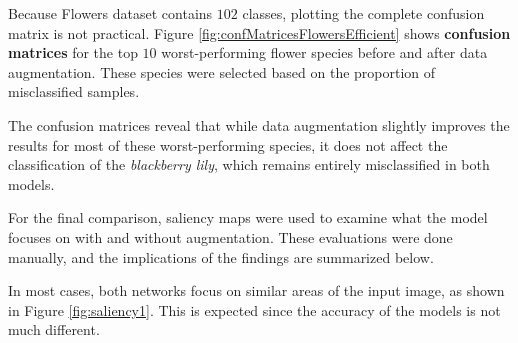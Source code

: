 Because Flowers dataset contains $102$ classes, plotting the complete confusion matrix is not practical. Figure \ref{fig:confMatricesFlowersEfficient} shows \textbf{confusion matrices} for the top $10$ worst-performing flower species before and after data augmentation. These species were selected based on the proportion of misclassified samples. 


The confusion matrices reveal that while data augmentation slightly improves the results for most of these worst-performing species, it does not affect the classification of the \textit{blackberry lily}, which remains entirely misclassified in both models.

For the final comparison, saliency maps were used to examine what the model focuses on with and without augmentation. These evaluations were done manually, and the implications of the findings are summarized below.

In most cases, both networks focus on similar areas of the input image, as shown in Figure \ref{fig:saliency1}. This is expected since the accuracy of the models is not much different.


